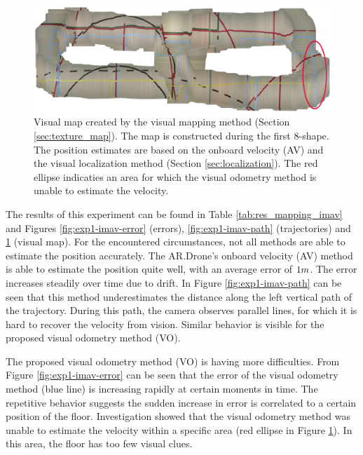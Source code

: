\begin{figure}[htb!]
\centering
\includegraphics[width=0.75\linewidth]{images/exp1-imav-map.png}
\caption{Visual map created by the visual mapping method (Section \ref{sec:texture_map}). The map is constructed during the first 8-shape. The position estimates are based on the onboard velocity (AV) and the visual localization method (Section \ref{sec:localization}). The red ellipse indicaties an area for which the visual odometry method is unable to estimate the velocity.}
\label{fig:exp1-imav-map}
\end{figure}

The results of this experiment can be found in Table \ref{tab:res_mapping_imav} and Figures \ref{fig:exp1-imav-error} (errors), \ref{fig:exp1-imav-path} (trajectories) and \ref{fig:exp1-imav-map} (visual map).
For the encountered circumstances, not all methods are able to estimate the position accurately.
The AR.Drone's onboard velocity (AV) method is able to estimate the position quite well, with an average error of $1\small{m}$.
The error increases steadily over time due to drift.
In Figure \ref{fig:exp1-imav-path} can be seen that this method underestimates the distance along the left vertical path of the trajectory.
During this path, the camera observes parallel lines, for which it is hard to recover the velocity from vision.
Similar behavior is visible for the proposed visual odometry method (VO).

The proposed visual odometry method (VO) is having more difficulties.
From Figure \ref{fig:exp1-imav-error} can be seen that the error of the visual odometry method (blue line) is increasing rapidly at certain moments in time.
The repetitive behavior suggests the sudden increase in error is correlated to a certain position of the floor.
Investigation showed that the visual odometry method was unable to estimate the velocity within a specific area (red ellipse in Figure \ref{fig:exp1-imav-map}).
In this area, the floor has too few visual clues.

